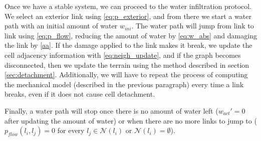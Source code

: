 \vspace{10pt}

Once we have a stable system, we can proceed to the water infiltration 
protocol. We select an exterior link using \ref{eq:p_exterior}, and 
from there we start a water path with an initial amount of water $w_{ini}$.
The water path will jump from link to link using \ref{eq:p_flow}, reducing 
the amount of water by \ref{eq:w_abs} and damaging the link by \ref{aa}.
If the damage applied to the link makes it break, we update the cell 
adjacency information with \ref{eq:neigh_update}, and if the graph becomes
disconnected, then we update the terrain using the method described 
in section \ref{sec:detachment}. Additionally, we will have to repeat 
the process of computing the mechanical model (described in the previous 
paragraph) every time a link breaks, even if it does not cause cell 
detachment.

\vspace{10pt}

Finally, a water path will stop once there is no amount of water 
left ($w_{act}' = 0$ after updating the amount of water) or when 
there are no more links to jump to ($p_{flow}(l_i,l_j) = 0$ for every 
$l_j \in \mathcal{N}(l_i)$ or $\mathcal{N}(l_i) = \emptyset$).